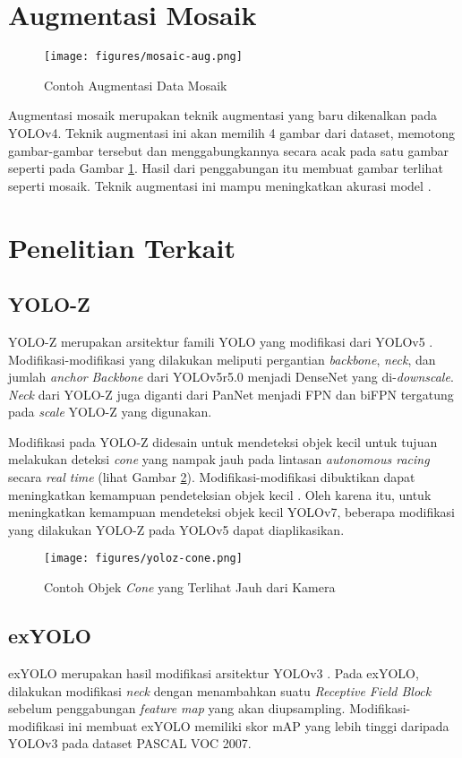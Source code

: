 \section{Augmentasi Mosaik}
\label{section:mosaic_study}
  \begin{figure}[ht]
    \centering
    \texttt{[image: figures/mosaic-aug.png]}
    \caption{Contoh Augmentasi Data Mosaik \parencite{yolov5}}
    \label{fig:mosaic}
  \end{figure}

  Augmentasi mosaik merupakan teknik augmentasi yang baru dikenalkan pada YOLOv4.
  Teknik augmentasi ini akan memilih 4 gambar dari dataset, memotong gambar-gambar tersebut dan menggabungkannya secara acak pada satu gambar seperti pada Gambar \ref{fig:mosaic}.
  Hasil dari penggabungan itu membuat gambar terlihat seperti mosaik.
  Teknik augmentasi ini mampu meningkatkan akurasi model \parencite{yolov4}.


\section{Penelitian Terkait}
\label{section:relatedwork}

  \subsection{YOLO-Z}
    YOLO-Z merupakan arsitektur famili YOLO yang modifikasi dari YOLOv5 \parencite{yoloz}.
    Modifikasi-modifikasi yang dilakukan meliputi pergantian \emph{backbone}, \emph{neck}, dan jumlah \emph{anchor}
    \emph{Backbone} dari YOLOv5r5.0 menjadi DenseNet yang di-\emph{downscale}.
    \emph{Neck} dari YOLO-Z juga diganti dari PanNet menjadi FPN dan biFPN tergatung pada \emph{scale} YOLO-Z yang digunakan.

    Modifikasi pada YOLO-Z didesain untuk mendeteksi objek kecil untuk tujuan melakukan deteksi \emph{cone} yang nampak jauh pada lintasan \emph{autonomous racing} secara \emph{real time} (lihat Gambar \ref{fig:yolozcone}).
    Modifikasi-modifikasi dibuktikan dapat meningkatkan kemampuan pendeteksian objek kecil \parencite{yoloz}.
    Oleh karena itu, untuk meningkatkan kemampuan mendeteksi objek kecil YOLOv7, beberapa modifikasi yang dilakukan YOLO-Z pada YOLOv5 dapat diaplikasikan.
    \begin{figure}[ht]
      \centering
      \texttt{[image: figures/yoloz-cone.png]}
      \caption{Contoh Objek \emph{Cone} yang Terlihat Jauh dari Kamera}
      \label{fig:yolozcone}
    \end{figure}

  \subsection{exYOLO}
    exYOLO merupakan hasil modifikasi arsitektur YOLOv3 \parencite{exyolo}.
    Pada exYOLO, dilakukan modifikasi \emph{neck} dengan menambahkan suatu \emph{Receptive Field Block} sebelum penggabungan \emph{feature map} yang akan diupsampling.
    Modifikasi-modifikasi ini membuat exYOLO memiliki skor mAP yang lebih tinggi daripada YOLOv3 pada dataset PASCAL VOC 2007.